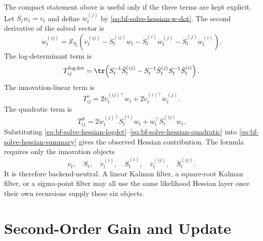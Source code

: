 The compact statement above is useful only if the three terms are kept explicit.
Let $S_tw_t=v_t$ and define $\dot w_t^{(j)}$ by
\eqref{eq:bf-solve-hessian-w-dot}.  The second derivative of the solved vector is
\begin{equation}
\label{eq:bf-solve-hessian-w-ddot}
  \ddot w_t^{(ij)}
  =
  \mathcal{S}_{S_t}\left(
    \ddot v_t^{(ij)}
    -\ddot S_t^{(ij)}w_t
    -\dot S_t^{(i)}\dot w_t^{(j)}
    -\dot S_t^{(j)}\dot w_t^{(i)}
  \right).
\end{equation}
The log-determinant term is
\begin{equation}
\label{eq:bf-solve-hessian-logdet}
  T_{ij}^{\log\det}
  =
  \tr\!\left(
    S_t^{-1}\ddot S_t^{(ij)}
    -S_t^{-1}\dot S_t^{(j)}S_t^{-1}\dot S_t^{(i)}
  \right).
\end{equation}
The innovation-linear term is
\begin{equation}
\label{eq:bf-solve-hessian-linear}
  T_{ij}^{v}
  =
  2\ddot v_t^{(ij)\top}w_t
  +2\dot v_t^{(i)\top}\dot w_t^{(j)}.
\end{equation}
The quadratic term is
\begin{equation}
\label{eq:bf-solve-hessian-quadratic}
  T_{ij}^{S}
  =
  2\dot w_t^{(j)\top}\dot S_t^{(i)}w_t
  +w_t^\top\ddot S_t^{(ij)}w_t .
\end{equation}
Substituting \eqref{eq:bf-solve-hessian-logdet}--\eqref{eq:bf-solve-hessian-quadratic}
into \eqref{eq:bf-solve-hessian-summary} gives the observed Hessian contribution.
The formula requires only the innovation objects
\[
  v_t,\quad S_t,\quad
  \dot v_t^{(i)},\quad \dot S_t^{(i)},\quad
  \ddot v_t^{(ij)},\quad \ddot S_t^{(ij)}.
\]
It is therefore backend-neutral.  A linear Kalman filter, a square-root Kalman
filter, or a sigma-point filter may all use the same likelihood Hessian layer
once their own recursions supply these six objects.

\section{Second-Order Gain and Update}
\label{sec:bf-hessian-update}

